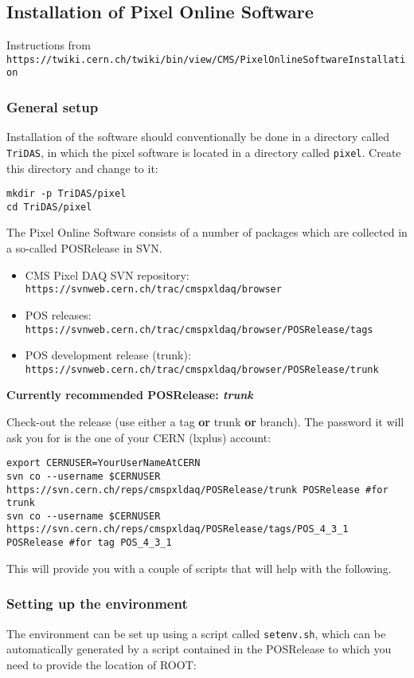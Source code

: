 
\subsection{Installation of Pixel Online Software}
Instructions from {\tt https://twiki.cern.ch/twiki/bin/view/CMS/PixelOnlineSoftwareInstallation}

\subsubsection{General setup}
Installation of the software should conventionally be done in a 
directory called {\tt TriDAS}, in which the pixel software is 
located in a directory called {\tt pixel}.  Create this directory 
and change to it:

\begin{verbatim}
mkdir -p TriDAS/pixel
cd TriDAS/pixel
\end{verbatim}

The Pixel Online Software consists of a number of packages which are 
collected in a so-called POSRelease in SVN.
\begin{itemize}
\item CMS Pixel DAQ SVN repository: {\tt https://svnweb.cern.ch/trac/cmspxldaq/browser}
\item POS releases: {\tt https://svnweb.cern.ch/trac/cmspxldaq/browser/POSRelease/tags}
\item POS development release (trunk): {\tt https://svnweb.cern.ch/trac/cmspxldaq/browser/POSRelease/trunk}
\end{itemize}

\textbf{Currently recommended POSRelease: \textit{trunk}}

Check-out the release (use either a tag \textbf{or} trunk 
\textbf{or} branch).  The password it will ask you for is the one of 
your CERN (lxplus) account:

\begin{verbatim}
export CERNUSER=YourUserNameAtCERN
svn co --username $CERNUSER https://svn.cern.ch/reps/cmspxldaq/POSRelease/trunk POSRelease #for trunk
svn co --username $CERNUSER https://svn.cern.ch/reps/cmspxldaq/POSRelease/tags/POS_4_3_1 POSRelease #for tag POS_4_3_1
\end{verbatim}

This will provide you with a couple of scripts that will help with 
the following.

\subsubsection{Setting up the environment}
The environment can be set up using a script called {\tt setenv.sh}, 
which can be automatically generated by a script contained in the 
POSRelease to which you need to provide the location of ROOT:


